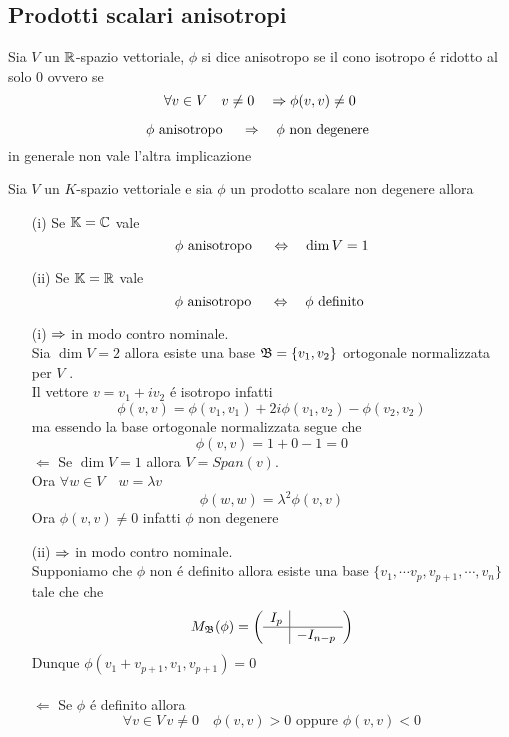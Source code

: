 \subsection{Prodotti scalari anisotropi}
\begin{defn}[Anisotropo]\bianco
Sia $V$ un $\mathbb{R}$-spazio vettoriale, $\phi$ si dice anisotropo se il cono isotropo \'e ridotto al solo $0$ ovvero se
$$ \forall v \in V \quad v\neq 0 \quad \Rightarrow \phi(v,v) \neq 0 $$
\end{defn}
\begin{oss}
$$\phi \text{ anisotropo } \quad \Rightarrow \quad \phi \text{ non degenere } $$
in generale non vale l'altra implicazione 
\end{oss}
\spazio
\begin{prop}  \label{anisotropi}Sia $V$ un $K$-spazio vettoriale e sia $\phi$ un prodotto scalare non degenere allora 
\begin{itemize}
\item[(i)] Se $\mathbb{K}=\mathbb{C}$ vale 
$$ \phi \text{ anisotropo } \quad \Leftrightarrow \quad \dim V = 1 $$
\item[(ii)] Se $\mathbb{K}=\mathbb{R}$ vale
$$ \phi \text{ anisotropo } \quad \Leftrightarrow \quad \phi \text{ definito } $$
\end{itemize}
\proof \bianco
\begin{itemize}
\item[(i)] $\Rightarrow $ in modo contro nominale.\\
Sia $\dim V = 2 $ allora esiste una base $\mathfrak{B} =\{ v_1, v_2 \}$ ortogonale normalizzata per $V$ .\\
Il vettore $v= v_1+iv_2 $ \'e isotropo infatti
$$ \phi(v,v) = \phi(v_1,v_1) + 2i \phi(v_1, v_2) - \phi(v_2,v_2) $$
ma essendo la base ortogonale normalizzata segue che
$$ \phi(v,v) = 1+0-1=0 $$
$\Leftarrow$ Se $\dim V = 1 $ allora $V = Span(v) $.\\
Ora $ \forall w \in V \quad w= \lambda v $ 
$$ \phi(w,w) = \lambda^2  \phi(v,v) $$ 
Ora $\phi(v,v)  \neq 0 $ infatti $\phi$ non degenere 
\item[(ii)]$\Rightarrow$ in modo contro nominale.\\
Supponiamo che $\phi$ non \'e definito allora esiste una base $\{ v_1, \cdots v_p, v_{p+1},\cdots , v_n \} $ tale che che 
$$ M_{\mathfrak{B}} (\phi) = \left( \begin{array}{c|c} I_p & \\ \hline & -I_{n-p} 
\end{array} \right) $$
Dunque $\phi(v_1 + v_{p+1}, v_1, v_{p+1}) = 0 $\\ \\
$\Leftarrow $ Se $\phi$ \'e definito allora 
$$ \forall v \in V \, v \neq 0 \quad \phi(v,v) >0 \text{ oppure } \phi(v,v) <0 $$
\endproof
\end{itemize}
\end{prop}
\newpage

